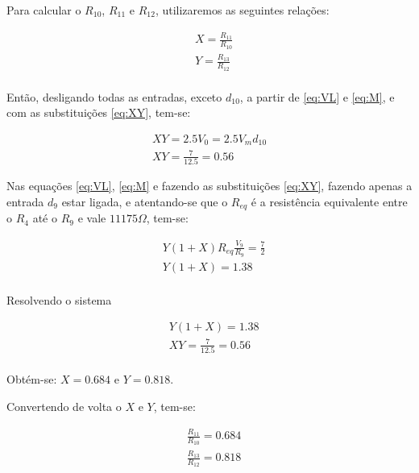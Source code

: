 Para calcular o $R_{10}$, $R_{11}$ e $R_{12}$, utilizaremos as seguintes relações:

\begin{equation}
    \label{eq:XY}
    \begin{aligned}
         & X = \frac{R_{11}}{R_{10}} \\
         & Y = \frac{R_{13}}{R_{12}} \\
    \end{aligned}
\end{equation}

Então, desligando todas as entradas, exceto $d_{10}$, a partir de \ref{eq:VL} e \ref{eq:M}, e com as substituições \ref{eq:XY}, tem-se:

\begin{equation}
    \begin{aligned}
        X Y = 2.5 V_0 = 2.5 V_m d_{10} \\
        X Y = \frac{7}{12.5} = 0.56
    \end{aligned}
\end{equation}

Nas equações \ref{eq:VL}, \ref{eq:M} e fazendo as substituições \ref{eq:XY}, fazendo apenas a entrada $d_{9}$ estar ligada, e atentando-se que o $R_{eq}$ é a resistência equivalente entre o $R_4$ até o $R_9$ e vale $11175\Omega$, tem-se:

\begin{equation}
    \begin{aligned}
         & Y ( 1 + X ) R_{eq} \frac{V_9}{R_9} = \frac{7}{2} \\
         & Y ( 1 + X ) = 1.38                               \\
    \end{aligned}
\end{equation}

Resolvendo o sistema

\begin{equation}
    \begin{aligned}
         & Y ( 1 + X ) = 1.38          \\
         & X Y = \frac{7}{12.5} = 0.56 \\
    \end{aligned}
\end{equation}

Obtém-se: $X = 0.684$ e $Y = 0.818$.

Convertendo de volta o $X$ e $Y$, tem-se:

\begin{equation}
    \begin{aligned}
         & \frac{R_{11}}{R_{10}} = 0.684 \\
         & \frac{R_{13}}{R_{12}} = 0.818 \\
    \end{aligned}
\end{equation}

